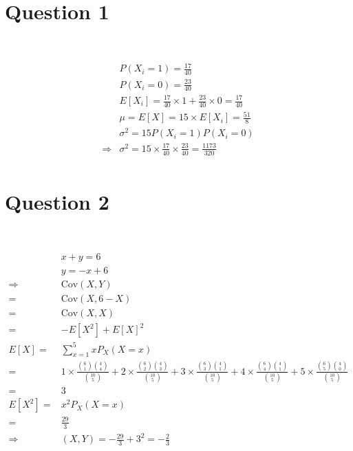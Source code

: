 \documentclass{article}
\begin{document}
\section*{Question 1}

~

\begin{align*}
    &P(X_i=1)=\frac{17}{40}\\
    &P(X_i=0)=\frac{23}{40}\\
    &E[X_i]=\frac{17}{40}\times1+\frac{23}{40}\times 0=\frac{17}{40}\\
    &\mu=E[X]=15\times E[X_i]=\frac{51}{8}\\
    &\sigma^2=15P(X_i=1)P(X_i=0)\\
    \Rightarrow&\sigma^2=15\times\frac{17}{40}\times\frac{23}{40}=\frac{1173}{320}\\
\end{align*}

\newpage

\section*{Question 2}

~

\begin{align*}
    &x+y=6\\
    &y=-x+6\\
    \Rightarrow&\text{Cov}(X,Y)\\
    =&\text{Cov}(X,6-X)\\
    =&\text{Cov}(X,X)\\
    =&-E[X^2]+E[X]^2\\
    E[X]=&\sum_{x=1}^{5}xP_X(X=x)\\
    =&1\times\frac{\binom{6}{1}\binom{4}{4}}{\binom{10}{5}}+2\times\frac{\binom{6}{2}\binom{4}{3}}{\binom{10}{5}}+3\times\frac{\binom{6}{3}\binom{4}{1}}{\binom{10}{5}}+4\times\frac{\binom{6}{4}\binom{4}{1}}{\binom{10}{5}}+5\times\frac{\binom{6}{5}\binom{4}{0}}{\binom{10}{5}}\\
    =&3\\
    E[X^2]=&x^2P_X(X=x)\\
    =&\frac{29}{3}\\
    \Rightarrow&(X,Y)=-\frac{29}{3}+3^2=-\frac{2}{3}\\
\end{align*}
\end{document}
